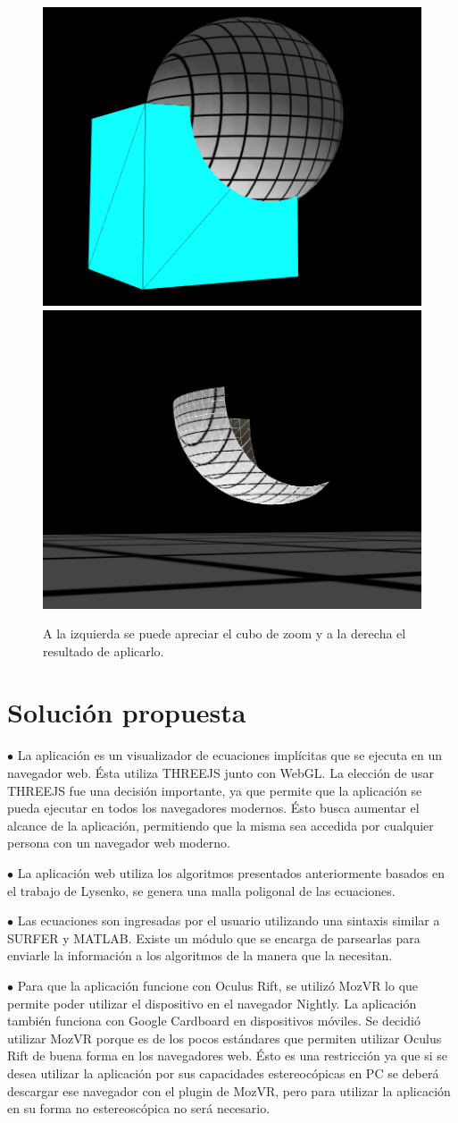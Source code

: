 \documentclass[12pt]{article}
\begin{document}
\begin{figure}[h!]
\includegraphics[width =0.45\linewidth]{cubo1.png}
\hfill
\includegraphics[width =0.45\linewidth]{cubo2.png}
\caption{ A la izquierda se puede apreciar el cubo de zoom y a la derecha el resultado de aplicarlo.}
\label{zoomCube}
\end{figure}
\clearpage
\null\newpage

\section{Solución propuesta}
$\bullet$ La aplicación es un visualizador de ecuaciones implícitas que se ejecuta en un navegador web. Ésta utiliza THREEJS junto con WebGL. La elección de usar THREEJS fue una decisión importante, ya que permite que la aplicación se pueda ejecutar en todos los navegadores modernos. Ésto busca aumentar el alcance de la aplicación, permitiendo que la misma sea accedida por cualquier persona con un navegador web moderno.

$\bullet$ La aplicación web utiliza los algoritmos presentados anteriormente basados en el trabajo de Lysenko\cite{mykola1}\cite{mykola2}, se genera una malla poligonal de las ecuaciones.  

$\bullet$ Las ecuaciones son ingresadas por el usuario utilizando una sintaxis similar a SURFER y MATLAB. Existe un módulo que se encarga de parsearlas para enviarle la información a los algoritmos de la manera que la necesitan.

$\bullet$ Para que la aplicación funcione con Oculus Rift, se utilizó MozVR lo que permite poder utilizar el dispositivo en el navegador Nightly. La aplicación también funciona con Google Cardboard en dispositivos móviles. Se decidió utilizar MozVR porque es de los pocos estándares que permiten utilizar Oculus Rift de buena forma en los navegadores web. Ésto es una restricción ya que si se desea utilizar la aplicación por sus capacidades estereocópicas en PC se deberá descargar ese navegador con el plugin de MozVR, pero para utilizar la aplicación en su forma no estereoscópica no será necesario.
\end{document}
